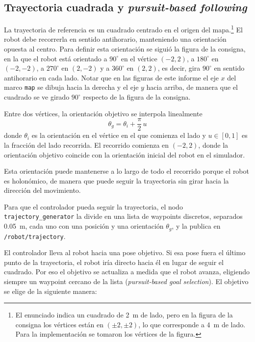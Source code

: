 \documentclass[11pt,a4paper]{article}
\begin{document}
\subsection{Trayectoria cuadrada y \emph{pursuit-based following}}
\label{sec:trayectoria}

La trayectoria de referencia es un cuadrado centrado en el origen del mapa.{\renewcommand{\thefootnote}{\fnsymbol{footnote}}\footnote{El enunciado indica un cuadrado de 2~m de lado, pero en la figura de la consigna los vértices están en $(\pm 2, \pm 2)$, lo que corresponde a 4~m de lado. Para la implementación se tomaron los vértices de la figura.}} El robot debe recorrerla en sentido antihorario, manteniendo una orientación opuesta al centro. Para definir esta orientación se siguió la figura de la consigna, en la que el robot está orientado a $90^\circ$ en el vértice $(-2, 2)$, a $180^\circ$ en $(-2, -2)$, a $270^\circ$ en $(2, -2)$ y a $360^\circ$ en $(2, 2)$, es decir, gira $90^\circ$ en sentido antihorario en cada lado. Notar que en las figuras de este informe el eje $x$ del marco \texttt{map} se dibuja hacia la derecha y el eje $y$ hacia arriba, de manera que el cuadrado se ve girado $90^\circ$ respecto de la figura de la consigna.

Entre dos vértices, la orientación objetivo se interpola linealmente
\begin{equation}
\theta_g = \theta_i + \frac{\pi}{2}\,u
\end{equation}
donde $\theta_i$ es la orientación en el vértice en el que comienza el lado y $u \in [0, 1]$ es la fracción del lado recorrida. El recorrido comienza en $(-2, 2)$, donde la orientación objetivo coincide con la orientación inicial del robot en el simulador.

Esta orientación puede mantenerse a lo largo de todo el recorrido porque el robot es holonómico, de manera que puede seguir la trayectoria sin girar hacia la dirección del movimiento.

Para que el controlador pueda seguir la trayectoria, el nodo \texttt{trajectory\_generator} la divide en una lista de waypoints discretos, separados 0.05~m, cada uno con una posición y una orientación $\theta_g$, y la publica en \texttt{/robot/trajectory}. 

El controlador lleva al robot hacia una pose objetivo. Si esa pose fuera el último punto de la trayectoria, el robot iría directo hacia él en lugar de seguir el cuadrado. Por eso el objetivo se actualiza a medida que el robot avanza, eligiendo siempre un waypoint cercano de la lista (\emph{pursuit-based goal selection}). El objetivo se elige de la siguiente manera:
\end{document}
